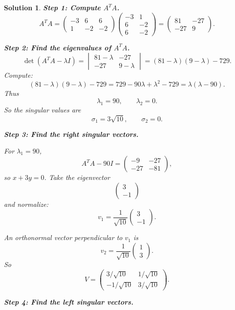 \documentclass[11pt,a4paper]{article}
\theoremstyle{sol}
\newtheorem*{solution}{Solution}
\begin{document}
\begin{solution}
\textbf{Step 1: Compute $A^TA$.}
\[
A^TA=
\begin{pmatrix}
-3&6&6\\
1&-2&-2
\end{pmatrix}
\begin{pmatrix}
-3&1\\
6&-2\\
6&-2
\end{pmatrix}
=
\begin{pmatrix}
81&-27\\
-27&9
\end{pmatrix}.
\]

\textbf{Step 2: Find the eigenvalues of $A^TA$.}
\[
\det(A^TA-\lambda I)
=
\begin{vmatrix}
81-\lambda&-27\\
-27&9-\lambda
\end{vmatrix}
=(81-\lambda)(9-\lambda)-729.
\]
Compute:
\[
(81-\lambda)(9-\lambda)-729
=729-90\lambda+\lambda^2-729
=\lambda(\lambda-90).
\]
Thus
\[
\lambda_1=90,\qquad \lambda_2=0.
\]
So the singular values are
\[
\sigma_1=3\sqrt{10},\qquad \sigma_2=0.
\]

\textbf{Step 3: Find the right singular vectors.}

For $\lambda_1=90$,
\[
A^TA-90I=
\begin{pmatrix}
-9&-27\\
-27&-81
\end{pmatrix},
\]
so $x+3y=0$. Take the eigenvector
\[
\begin{pmatrix}3\\-1\end{pmatrix}
\]
and normalize:
\[
v_1=\frac{1}{\sqrt{10}}\begin{pmatrix}3\\-1\end{pmatrix}.
\]

An orthonormal vector perpendicular to $v_1$ is
\[
v_2=\frac{1}{\sqrt{10}}\begin{pmatrix}1\\3\end{pmatrix}.
\]
So
\[
V=
\begin{pmatrix}
3/\sqrt{10}&1/\sqrt{10}\\
-1/\sqrt{10}&3/\sqrt{10}
\end{pmatrix}.
\]

\textbf{Step 4: Find the left singular vectors.}


\end{solution}
\end{document}
